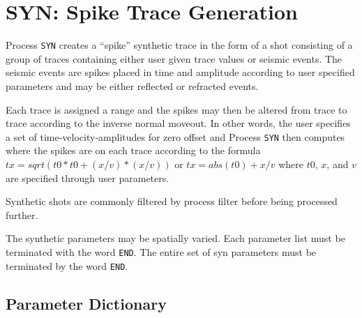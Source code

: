 \section{SYN: Spike Trace Generation}
\label{cmd_syn}

Process \texttt{SYN} creates a ``spike'' synthetic trace in the form of a \gls{shot}
consisting of a group of traces containing either user given trace
values or seismic events.  The seismic events are spikes placed in time
and amplitude according to user specified parameters and may be either
reflected or refracted events.

Each trace is assigned a range and the spikes may then be altered from
trace to trace according to the inverse normal moveout.  In other words,
the user specifies a set of time-velocity-amplitudes for zero offset and
Process \texttt{SYN} then computes where the spikes are on each trace according
to the formula $tx=sqrt(t0*t0+(x/v)*(x/v))$ or $tx=abs(t0)+x/v$ where $t0$, $x$,
and $v$ are specified through user parameters.

Synthetic \glspl{shot} are commonly filtered by process filter before being
processed further.

The synthetic parameters may be spatially varied.  Each parameter list
must be terminated with the word \texttt{END}.  The entire set of syn parameters
must be terminated by the word \texttt{END}.

\subsection{Parameter Dictionary}

